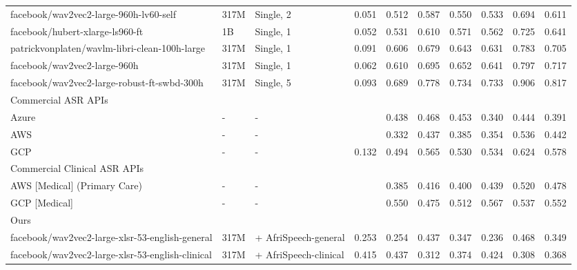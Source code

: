 \documentclass[11pt,a4paper]{article}
\begin{document}
\begin{table*}
\begin{tabular}{l|l|p{1.8cm}|p{0.7cm}|l|l|l|l|l|l}
facebook/wav2vec2-large-960h-lv60-self   & 317M & Single, 2  &  0.051  &   0.512 &    0.587 &  0.550 &   0.533 &    0.694 &  0.611 \\
facebook/hubert-xlarge-ls960-ft      & 1B & Single, 1  &    0.052    &   0.531 &    0.610 &  0.571 &   0.562 &    0.725 &  0.641 \\
patrickvonplaten/wavlm-libri-clean-100h-large   & 317M & Single, 1   &  0.091  &   0.606 &    0.679 &  0.643 &   0.631 &    0.783 &  0.705 \\
facebook/wav2vec2-large-960h           & 317M & Single, 1   &   0.062   &   0.610 &    0.695 &  0.652 &   0.641 &    0.797 &  0.717 \\
facebook/wav2vec2-large-robust-ft-swbd-300h & 317M & Single, 5  & 0.093 &   0.689 &    0.778 &  0.734 &   0.733 &    0.906 &  0.817 \\
\hline
\multicolumn{10}{l}{Commercial ASR APIs}\\
\hline
Azure             & - & - &  &   0.438 &    0.468 &  0.453 &   0.340 &    0.444 &  0.391 \\
AWS         & - & - & &   0.332 &    0.437 &  0.385 &   0.354 &    0.536 &  0.442 \\
GCP        & - & - &  0.132  &   0.494 &    0.565 &  0.530 &   0.534 &    0.624 &  0.578 \\
\hline
\multicolumn{10}{l}{Commercial Clinical ASR APIs}\\
\hline
AWS [Medical] (Primary Care)        & -& -  & &   0.385 &    0.416 &  0.400 &   0.439 &    0.520 &  0.478 \\
GCP [Medical]        & - & - & &   0.550 &    0.475 &  0.512 &   0.567 &    0.537 &  0.552 \\
\hline
\multicolumn{10}{l}{Ours }\\
\hline
facebook/wav2vec2-large-xlsr-53-english-general & 317M & + AfriSpeech-general &  0.253 &   0.254 &    0.437 &  0.347 &   0.236 &    0.468 &  0.349 \\
facebook/wav2vec2-large-xlsr-53-english-clinical & 317M & + AfriSpeech-clinical  & 0.415 &   0.437 &    0.312 &  0.374 &   0.424 &    0.308 &  0.368 \\

\end{tabular}
\end{table*}
\end{document}
